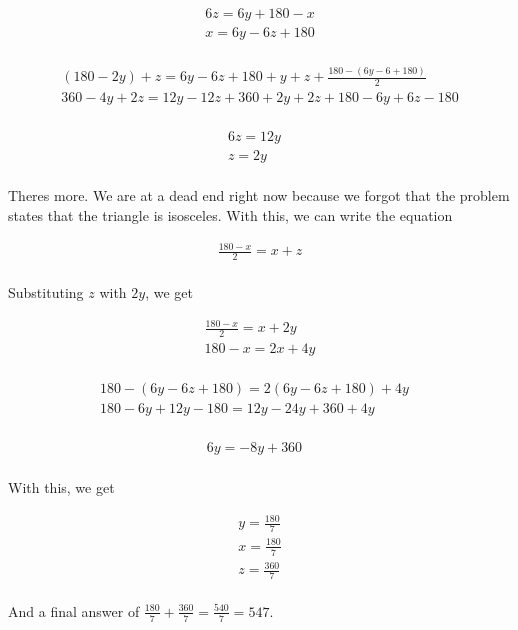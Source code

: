 \begin{enumerate}
 \begin{align*} 6z=6y+180-x \\ x=6y-6z+180 \\ \end{align*}


 \begin{align*} (180-2y)+z=6y-6z+180+y+z+\frac{180-(6y-6+180)}{2} \\ 360-4y+2z=12y-12z+360+2y+2z+180-6y+6z-180 \\ \end{align*}


 \begin{align*} 6z=12y& \\ z=2y& \\ \end{align*}


 Theres more. We are at a dead end right now because we forgot that the problem states that the triangle is isosceles. With this, we can write the equation

 
 \begin{align*} \frac{180-x}{2}=x+z \\ \end{align*}


 Substituting $z$ with $2y$, we get

 
 \begin{align*} \frac{180-x}{2}=x+2y \\ 180-x=2x+4y \\ \end{align*}

 \begin{align*} 180-(6y-6z+180)=2(6y-6z+180)+4y& \\ 180-6y+12y-180=12y-24y+360+4y& \\ \end{align*}

 \begin{align*} 6y=-8y+360& \\ \end{align*}


 With this, we get

 
 \begin{align*} y=\frac{180}{7} \\ x=\frac{180}{7} \\ z=\frac{360}{7} \\ \end{align*}


 And a final answer of $\frac{180}{7}+\frac{360}{7} = \frac{540}{7} = \boxed{547}$.


\end{enumerate}
